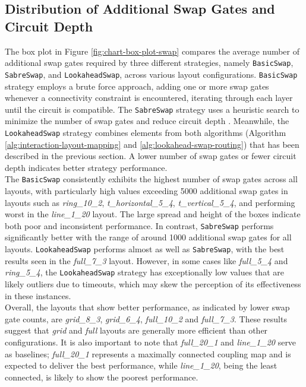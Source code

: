 \subsection{Distribution of Additional Swap Gates and Circuit Depth} %
The box plot in Figure \ref{fig:chart-box-plot-swap} compares the average number of additional swap gates required by three different strategies, namely \lstinline{BasicSwap}, \lstinline{SabreSwap}, and \lstinline{LookaheadSwap}, across various layout configurations. \lstinline{BasicSwap} \cite{ibmquantum_basicswap} strategy employs a brute force approach, adding one or more swap gates whenever a connectivity constraint is encountered, iterating through each layer until the circuit is compatible. The \lstinline{SabreSwap} strategy uses a heuristic search to minimize the number of swap gates and reduce circuit depth \cite{li_tackling_2019, ibmquantum_sabreswap}. Meanwhile, the \lstinline{LookaheadSwap} strategy combines elements from both algorithms (Algorithm \ref{alg:interaction-layout-mapping} and \ref{alg:lookahead-swap-routing}) that has been described in the previous section. A lower number of swap gates or fewer circuit depth indicates better strategy performance. \\
The \lstinline{BasicSwap} consistently exhibits the highest number of swap gates across all layouts, with particularly high values exceeding 5000 additional swap gates in layouts such as \textit{ring\_10\_2}, \textit{t\_horizontal\_5\_4}, \textit{t\_vertical\_5\_4}, and performing worst in the \textit{line\_1\_20} layout. The large spread and height of the boxes indicate both poor and inconsistent performance. In contrast, \lstinline{SabreSwap} performs significantly better with the range of around 1000 additional swap gates for all layouts. \lstinline{LookaheadSwap} performs almost as well as \lstinline{SabreSwap}, with the best results seen in the \textit{full\_7\_3} layout. However, in some cases like \textit{full\_5\_4} and \textit{ring\_5\_4}, the \lstinline{LookaheadSwap} strategy has exceptionally low values that are likely outliers due to timeouts, which may skew the perception of its effectiveness in these instances. \\
Overall, the layouts that show better performance, as indicated by lower swap gate counts, are \textit{grid\_8\_3}, \textit{grid\_6\_4}, \textit{full\_10\_2} and \textit{full\_7\_3}. These results suggest that \textit{grid} and \textit{full} layouts are generally more efficient than other configurations. It is also important to note that \textit{full\_20\_1} and \textit{line\_1\_20} serve as baselines; \textit{full\_20\_1} represents a maximally connected coupling map and is expected to deliver the best performance, while \textit{line\_1\_20}, being the least connected, is likely to show the poorest performance. \\
